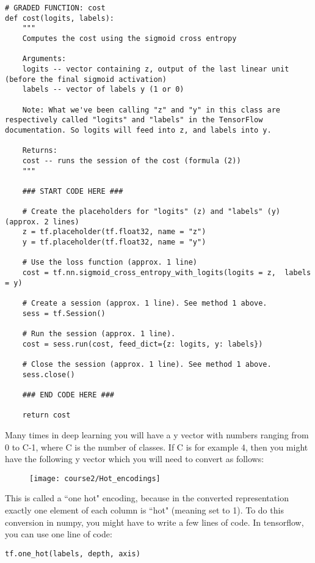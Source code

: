 \begin{verbatim}  
# GRADED FUNCTION: cost
def cost(logits, labels):
    """
    Computes the cost using the sigmoid cross entropy
    
    Arguments:
    logits -- vector containing z, output of the last linear unit (before the final sigmoid activation)
    labels -- vector of labels y (1 or 0) 
    
    Note: What we've been calling "z" and "y" in this class are respectively called "logits" and "labels" in the TensorFlow documentation. So logits will feed into z, and labels into y. 
    
    Returns:
    cost -- runs the session of the cost (formula (2))
    """
    
    ### START CODE HERE ### 
    
    # Create the placeholders for "logits" (z) and "labels" (y) (approx. 2 lines)
    z = tf.placeholder(tf.float32, name = "z")
    y = tf.placeholder(tf.float32, name = "y")
    
    # Use the loss function (approx. 1 line)
    cost = tf.nn.sigmoid_cross_entropy_with_logits(logits = z,  labels = y)
    
    # Create a session (approx. 1 line). See method 1 above.
    sess = tf.Session()
    
    # Run the session (approx. 1 line).
    cost = sess.run(cost, feed_dict={z: logits, y: labels})
    
    # Close the session (approx. 1 line). See method 1 above.
    sess.close()
    
    ### END CODE HERE ###
    
    return cost
\end{verbatim} 



Many times in deep learning you will have a y vector with numbers ranging from 0 to C-1, where C is the number of classes. If C is for example 4, then you might have the following y vector which you will need to convert as follows:

\begin{figure}[h]
\begin{center}
\texttt{[image: course2/Hot\_encodings]}
\end{center}
\end{figure}

This is called a ``one hot" encoding, because in the converted representation exactly one element of each column is ``hot" (meaning set to 1). To do this conversion in numpy, you might have to write a few lines of code. In tensorflow, you can use one line of code:
\begin{verbatim} 
tf.one_hot(labels, depth, axis)
\end{verbatim} 

